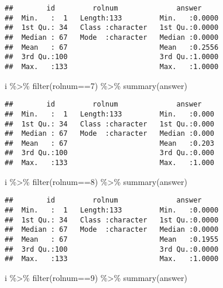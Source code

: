 \documentclass[
]{article}
\newenvironment{Shaded}{\begin{snugshade}}{\end{snugshade}}
\newcommand{\DecValTok}[1]{\textcolor[rgb]{0.00,0.00,0.81}{#1}}
\newcommand{\FunctionTok}[1]{\textcolor[rgb]{0.00,0.00,0.00}{#1}}
\newcommand{\NormalTok}[1]{#1}
\newcommand{\SpecialCharTok}[1]{\textcolor[rgb]{0.00,0.00,0.00}{#1}}
\begin{document}
\begin{enumerate}
\begin{verbatim}
##        id         rolnum              answer      
##  Min.   :  1   Length:133         Min.   :0.0000  
##  1st Qu.: 34   Class :character   1st Qu.:0.0000  
##  Median : 67   Mode  :character   Median :0.0000  
##  Mean   : 67                      Mean   :0.2556  
##  3rd Qu.:100                      3rd Qu.:1.0000  
##  Max.   :133                      Max.   :1.0000
\end{verbatim}

\begin{Shaded}
\begin{Highlighting}[]
\NormalTok{i }\SpecialCharTok{\%\textgreater{}\%} \FunctionTok{filter}\NormalTok{(rolnum}\SpecialCharTok{==}\DecValTok{7}\NormalTok{) }\SpecialCharTok{\%\textgreater{}\%} \FunctionTok{summary}\NormalTok{(answer)}
\end{Highlighting}
\end{Shaded}

\begin{verbatim}
##        id         rolnum              answer     
##  Min.   :  1   Length:133         Min.   :0.000  
##  1st Qu.: 34   Class :character   1st Qu.:0.000  
##  Median : 67   Mode  :character   Median :0.000  
##  Mean   : 67                      Mean   :0.203  
##  3rd Qu.:100                      3rd Qu.:0.000  
##  Max.   :133                      Max.   :1.000
\end{verbatim}

\begin{Shaded}
\begin{Highlighting}[]
\NormalTok{i }\SpecialCharTok{\%\textgreater{}\%} \FunctionTok{filter}\NormalTok{(rolnum}\SpecialCharTok{==}\DecValTok{8}\NormalTok{) }\SpecialCharTok{\%\textgreater{}\%} \FunctionTok{summary}\NormalTok{(answer)}
\end{Highlighting}
\end{Shaded}

\begin{verbatim}
##        id         rolnum              answer      
##  Min.   :  1   Length:133         Min.   :0.0000  
##  1st Qu.: 34   Class :character   1st Qu.:0.0000  
##  Median : 67   Mode  :character   Median :0.0000  
##  Mean   : 67                      Mean   :0.1955  
##  3rd Qu.:100                      3rd Qu.:0.0000  
##  Max.   :133                      Max.   :1.0000
\end{verbatim}

\begin{Shaded}
\begin{Highlighting}[]
\NormalTok{i }\SpecialCharTok{\%\textgreater{}\%} \FunctionTok{filter}\NormalTok{(rolnum}\SpecialCharTok{==}\DecValTok{9}\NormalTok{) }\SpecialCharTok{\%\textgreater{}\%} \FunctionTok{summary}\NormalTok{(answer)}
\end{Highlighting}
\end{Shaded}


\end{enumerate}
\end{document}
